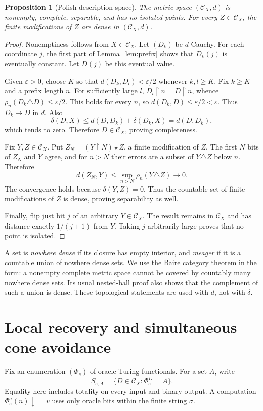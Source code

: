 \documentclass[11pt,a4paper]{article}
\newcommand{\CD}{\mathcal C}
\newcommand{\patch}{\mathbin\star}
\newcommand{\restr}{\mathbin\upharpoonright}
\newtheorem{proposition}[theorem]{Proposition}
\theoremstyle{definition}\newtheorem{definition}[theorem]{Definition}
\theoremstyle{remark}\newtheorem{remark}[theorem]{Remark}
\begin{document}
\begin{proposition}[Polish description space]\label{prop:polish}
The metric space $(\CD_X,d)$ is nonempty, complete, separable, and has no
isolated points. For every $Z\in\CD_X$, the finite modifications of $Z$ are
dense in $(\CD_X,d)$.
\end{proposition}
\begin{proof}
Nonemptiness follows from $X\in\CD_X$. Let $(D_k)$ be $d$-Cauchy. For each
coordinate $j$, the first part of Lemma~\ref{lem:prefix} shows that $D_k(j)$
is eventually constant. Let $D(j)$ be this eventual value.

Given $\varepsilon>0$, choose $K$ so that $d(D_k,D_l)<\varepsilon/2$ whenever
$k,l\ge K$. Fix $k\ge K$ and a prefix length $n$. For sufficiently large $l$,
$D_l\restr n=D\restr n$, whence
$\rho_n(D_k\triangle D)\le\varepsilon/2$. This holds for every $n$, so
$d(D_k,D)\le\varepsilon/2<\varepsilon$. Thus $D_k\to D$ in $d$. Also
\[
 \delta(D,X)\le d(D,D_k)+\delta(D_k,X)=d(D,D_k),
\]
which tends to zero. Therefore $D\in\CD_X$, proving completeness.

Fix $Y,Z\in\CD_X$. Put $Z_N=(Y\restr N)\patch Z$, a finite modification of
$Z$. The first $N$ bits of $Z_N$ and $Y$ agree, and for $n>N$ their errors are
a subset of $Y\triangle Z$ below $n$. Therefore
\begin{equation}\label{eq:finite-dense}
 d(Z_N,Y)\le\sup_{n>N}\rho_n(Y\triangle Z)\longrightarrow0.
\end{equation}
The convergence holds because $\delta(Y,Z)=0$. Thus the countable set of
finite modifications of $Z$ is dense, proving separability as well.

Finally, flip just bit $j$ of an arbitrary $Y\in\CD_X$. The result remains
in $\CD_X$ and has distance exactly $1/(j+1)$ from $Y$. Taking $j$ arbitrarily
large proves that no point is isolated.
\end{proof}

A set is \emph{nowhere dense} if its closure has empty interior, and
\emph{meager} if it is a countable union of nowhere dense sets. We use the
Baire category theorem in the form: a nonempty complete metric space cannot
be covered by countably many nowhere dense sets. Its usual nested-ball proof
also shows that the complement of such a union is dense. These topological
statements are used with $d$, not with $\delta$.

\section{Local recovery and simultaneous cone avoidance}
\label{sec:recovery}
Fix an enumeration $(\Phi_e)$ of oracle Turing functionals. For a set $A$,
write
\[
 S_{e,A}=\{D\in\CD_X:\Phi_e^D=A\}.
\]
Equality here includes totality on every input and binary output. A
computation $\Phi_e^\sigma(n)\downarrow=v$ uses only oracle bits within the
finite string $\sigma$.
\end{document}
